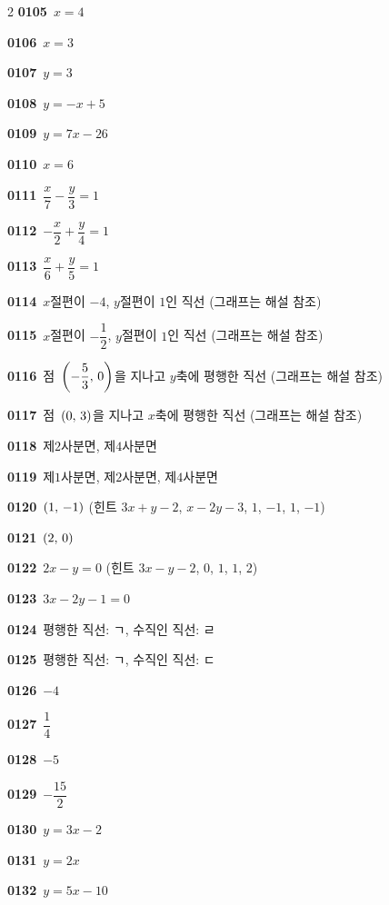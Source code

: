 \documentclass[10pt,a4paper]{article}
\begin{document}
\begin{multicols}{2}
\noindent\textbf{0105}\ $x=4$\par
\noindent\textbf{0106}\ $x=3$\par
\noindent\textbf{0107}\ $y=3$\par
\noindent\textbf{0108}\ $y=-x+5$\par
\noindent\textbf{0109}\ $y=7x-26$\par
\noindent\textbf{0110}\ $x=6$\par
\noindent\textbf{0111}\ $\dfrac{x}{7}-\dfrac{y}{3}=1$\par
\noindent\textbf{0112}\ $-\dfrac{x}{2}+\dfrac{y}{4}=1$\par
\noindent\textbf{0113}\ $\dfrac{x}{6}+\dfrac{y}{5}=1$\par
\noindent\textbf{0114}\ $x$절편이 $-4$, $y$절편이 $1$인 직선 (그래프는 해설 참조)\par
\noindent\textbf{0115}\ $x$절편이 $-\dfrac{1}{2}$, $y$절편이 $1$인 직선 (그래프는 해설 참조)\par
\noindent\textbf{0116}\ 점~$\left(-\dfrac{5}{3},\mkern3mu 0\right)$을 지나고 $y$축에 평행한 직선 (그래프는 해설 참조)\par
\noindent\textbf{0117}\ 점~$(0,\mkern3mu 3)$을 지나고 $x$축에 평행한 직선 (그래프는 해설 참조)\par
\noindent\textbf{0118}\ 제$2$사분면, 제$4$사분면\par
\noindent\textbf{0119}\ 제$1$사분면, 제$2$사분면, 제$4$사분면\par
\noindent\textbf{0120}\ $(1,\mkern3mu -1)$ (힌트 $3x+y-2$, $x-2y-3$, $1$, $-1$, $1$, $-1$)\par
\noindent\textbf{0121}\ $(2,\mkern3mu 0)$\par
\noindent\textbf{0122}\ $2x-y=0$ (힌트 $3x-y-2$, $0$, $1$, $1$, $2$)\par
\noindent\textbf{0123}\ $3x-2y-1=0$\par
\noindent\textbf{0124}\ 평행한 직선: ㄱ, 수직인 직선: ㄹ\par
\noindent\textbf{0125}\ 평행한 직선: ㄱ, 수직인 직선: ㄷ\par
\noindent\textbf{0126}\ $-4$\par
\noindent\textbf{0127}\ $\dfrac{1}{4}$\par
\noindent\textbf{0128}\ $-5$\par
\noindent\textbf{0129}\ $-\dfrac{15}{2}$\par
\noindent\textbf{0130}\ $y=3x-2$\par
\noindent\textbf{0131}\ $y=2x$\par
\noindent\textbf{0132}\ $y=5x-10$\par

\end{multicols}
\end{document}
